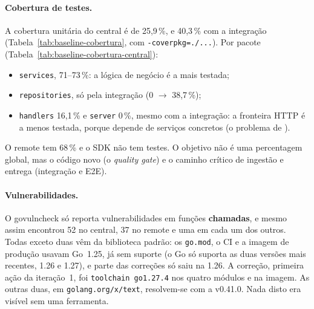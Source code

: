 \paragraph{Cobertura de testes.}
A cobertura unitária do central é de 25,9\,\%, e 40,3\,\% com a integração (Tabela~\ref{tab:baseline-cobertura},
com \texttt{-coverpkg=./...}). Por pacote (Tabela~\ref{tab:baseline-cobertura-central}):
\begin{itemize}
  \item \texttt{services}, 71--73\,\%: a lógica de negócio é a mais testada;
  \item \texttt{repositories}, só pela integração (0 $\to$ 38,7\,\%);
  \item \texttt{handlers} 16,1\,\% e \texttt{server} 0\,\%, mesmo com a integração: a fronteira HTTP é a menos
        testada, porque depende de serviços concretos (o problema de ).
\end{itemize}
O remote tem 68\,\% e o SDK não tem testes. O objetivo não é uma percentagem global, mas o código novo (o
\emph{quality gate}) e o caminho crítico de ingestão e entrega (integração e E2E).


\paragraph{Vulnerabilidades.}
O govulncheck só reporta vulnerabilidades em funções \textbf{chamadas}, e mesmo assim encontrou 52 no central, 37
no remote e uma em cada um dos outros. Todas exceto duas vêm da biblioteca padrão: os \texttt{go.mod}, o CI e a
imagem de produção usavam Go~1.25, já sem suporte (o Go só suporta as duas versões mais recentes, 1.26 e 1.27), e
parte das correções só saiu na 1.26. A correção, primeira ação da iteração~1, foi \texttt{toolchain go1.27.4} nos
quatro módulos e na imagem. As outras duas, em \texttt{golang.org/x/text}, resolvem-se com a v0.41.0. Nada disto era
visível sem uma ferramenta.

